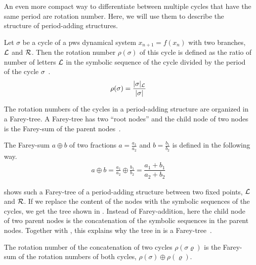 An even more compact way to differentiate between multiple cycles that have the same period are rotation number.
Here, we will use them to describe the structure of period-adding structures.

\begin{definition}
	Let $\sigma$ be a cycle of a \gls{pws} dynamical system $x_{n+1} = f(x_n)$ with two branches, $\mathcal{L}$ and $\mathcal{R}$.
	Then the rotation number $\rho(\sigma)$ of this cycle is defined as the ratio of number of letters $\mathcal{L}$ in the symbolic sequence of the cycle divided by the period of the cycle $\sigma$~\cite{Keener80}.
	\begin{align}
		\rho(\sigma) = \dfrac{|\sigma|_{\mathcal{L}}}{|\sigma|}
	\end{align}
\end{definition}

The rotation numbers of the cycles in a period-adding structure are organized in a Farey-tree.
A Farey-tree has two ``root nodes'' and the child node of two nodes is the Farey-sum of the parent nodes~\cite{granados14adding}.

\begin{definition}
	The Farey-sum $a \oplus b$ of two fractions $a = \frac{a_1}{a_2}$ and $b = \frac{b_1}{b_2}$ is defined in the following way.
	\begin{align}
		a \oplus b = \frac{a_1}{a_2} \oplus \frac{b_1}{b_2} = \dfrac{a_1 + b_1}{a_2 + b_2}
	\end{align}
\end{definition}

 shows such a Farey-tree of a period-adding structure between two fixed points, $\mathcal{L}$ and $\mathcal{R}$.
If we replace the content of the nodes with the symbolic sequences of the cycles, we get the tree shown in .
Instead of Farey-addition, here the child node of two parent nodes is the concatenation of the symbolic sequences in the parent nodes.
Together with , this explains why the  tree in  is a Farey-tree~\cite{granados14adding}.

\begin{theorem}
	The rotation number of the concatenation of two cycles $\rho(\sigma\varrho)$ is the Farey-sum of the rotation numbers of both cycles, $\rho(\sigma) \oplus \rho(\varrho)$.
	\label{theorem:state.rot.num.concat}
\end{theorem}

